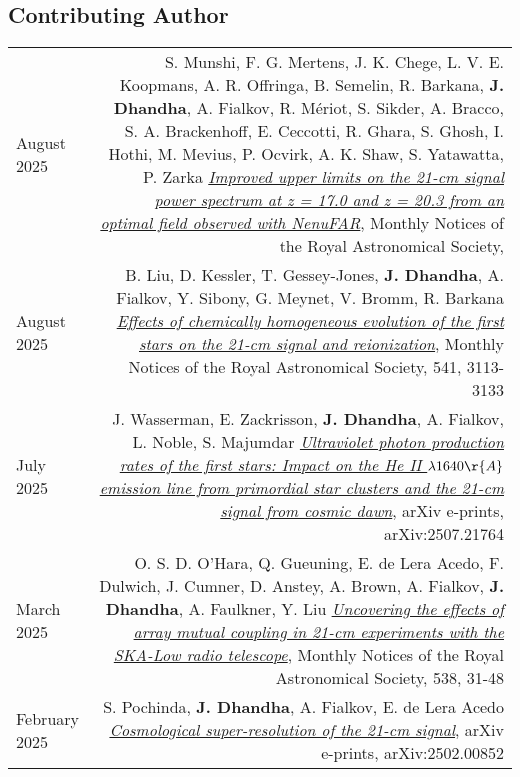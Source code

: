 \documentclass{article}
\begin{document}
\subsection*{Contributing Author}

\begin{longtable}{L!{\vrule}R}
    August 2025 &
    S. Munshi, F. G. Mertens, J. K. Chege, L. V. E. Koopmans, A. R. Offringa, B. Semelin, R. Barkana, \textbf{J. Dhandha}, A. Fialkov, R. M\'eriot, S. Sikder, A. Bracco, S. A. Brackenhoff, E. Ceccotti, R. Ghara, S. Ghosh, I. Hothi, M. Mevius, P. Ocvirk, A. K. Shaw, S. Yatawatta, P. Zarka
    \href{https://ui.adsabs.harvard.edu/abs/2025MNRAS.tmp.1333M}{\textit{Improved upper limits on the 21-cm signal power spectrum at z = 17.0 and z = 20.3 from an optimal field observed with NenuFAR}},
    Monthly Notices of the Royal Astronomical Society,  \\

    August 2025 &
    B. Liu, D. Kessler, T. Gessey-Jones, \textbf{J. Dhandha}, A. Fialkov, Y. Sibony, G. Meynet, V. Bromm, R. Barkana
    \href{https://ui.adsabs.harvard.edu/abs/2025MNRAS.541.3113L}{\textit{Effects of chemically homogeneous evolution of the first stars on the 21-cm signal and reionization}},
    Monthly Notices of the Royal Astronomical Society, 541, 3113-3133 \\

    July 2025 &
    J. Wasserman, E. Zackrisson, \textbf{J. Dhandha}, A. Fialkov, L. Noble, S. Majumdar
    \href{https://ui.adsabs.harvard.edu/abs/2025arXiv250721764W}{\textit{Ultraviolet photon production rates of the first stars: Impact on the He II $\lambda 1640 \r{A}$ emission line from primordial star clusters and the 21-cm signal from cosmic dawn}},
    arXiv e-prints, arXiv:2507.21764 \\

    March 2025 &
    O. S. D. O'Hara, Q. Gueuning, E. de Lera Acedo, F. Dulwich, J. Cumner, D. Anstey, A. Brown, A. Fialkov, \textbf{J. Dhandha}, A. Faulkner, Y. Liu
    \href{https://ui.adsabs.harvard.edu/abs/2025MNRAS.538...31O}{\textit{Uncovering the effects of array mutual coupling in 21-cm experiments with the SKA-Low radio telescope}},
    Monthly Notices of the Royal Astronomical Society, 538, 31-48 \\

    February 2025 &
    S. Pochinda, \textbf{J. Dhandha}, A. Fialkov, E. de Lera Acedo
    \href{https://ui.adsabs.harvard.edu/abs/2025arXiv250200852P}{\textit{Cosmological super-resolution of the 21-cm signal}},
    arXiv e-prints, arXiv:2502.00852 \\


\end{longtable}
\end{document}
